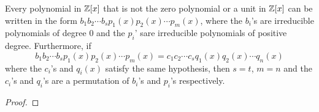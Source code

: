 \begin{theorem}
	Every polynomial in $\mathbb{Z}[x]$ that is not the zero polynomial or a unit in $\mathbb{Z}[x]$ can be written in the form $b_1b_2\cdots b_sp_1(x)p_2(x)\cdots p_m(x)$, where the $b_i$'s are irreducible polynomials of degree $0$ and the $p_i$' sare irreducible polynomials of positive degree. Furthermore, if 
	\begin{equation*}
		b_1b_2\cdots b_sp_1(x)p_2(x)\cdots p_m(x) = c_1c_2\cdots c_sq_1(x)q_2(x)\cdots q_n(x)
	\end{equation*}
	where the $c_i$'s and $q_i(x)$ satisfy the same hypothesis, then $s=t$, $m=n$ and the $c_i$'s and $q_i$'s are a permutation of $b_i$'s and $p_i$'s respectively.
\end{theorem}
\begin{proof}
\end{proof}